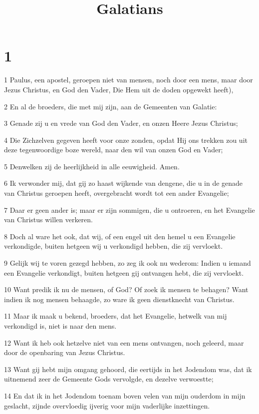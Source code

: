 

\title{Galatians}



\chapter{1}

\par 1 Paulus, een apostel, geroepen niet van mensen, noch door een mens, maar door Jezus Christus, en God den Vader, Die Hem uit de doden opgewekt heeft),
\par 2 En al de broeders, die met mij zijn, aan de Gemeenten van Galatie:
\par 3 Genade zij u en vrede van God den Vader, en onzen Heere Jezus Christus;
\par 4 Die Zichzelven gegeven heeft voor onze zonden, opdat Hij ons trekken zou uit deze tegenwoordige boze wereld, naar den wil van onzen God en Vader;
\par 5 Denwelken zij de heerlijkheid in alle eeuwigheid. Amen.
\par 6 Ik verwonder mij, dat gij zo haast wijkende van dengene, die u in de genade van Christus geroepen heeft, overgebracht wordt tot een ander Evangelie;
\par 7 Daar er geen ander is; maar er zijn sommigen, die u ontroeren, en het Evangelie van Christus willen verkeren.
\par 8 Doch al ware het ook, dat wij, of een engel uit den hemel u een Evangelie verkondigde, buiten hetgeen wij u verkondigd hebben, die zij vervloekt.
\par 9 Gelijk wij te voren gezegd hebben, zo zeg ik ook nu wederom: Indien u iemand een Evangelie verkondigt, buiten hetgeen gij ontvangen hebt, die zij vervloekt.
\par 10 Want predik ik nu de mensen, of God? Of zoek ik mensen te behagen? Want indien ik nog mensen behaagde, zo ware ik geen dienstknecht van Christus.
\par 11 Maar ik maak u bekend, broeders, dat het Evangelie, hetwelk van mij verkondigd is, niet is naar den mens.
\par 12 Want ik heb ook hetzelve niet van een mens ontvangen, noch geleerd, maar door de openbaring van Jezus Christus.
\par 13 Want gij hebt mijn omgang gehoord, die eertijds in het Jodendom was, dat ik uitnemend zeer de Gemeente Gods vervolgde, en dezelve verwoestte;
\par 14 En dat ik in het Jodendom toenam boven velen van mijn ouderdom in mijn geslacht, zijnde overvloedig ijverig voor mijn vaderlijke inzettingen.
